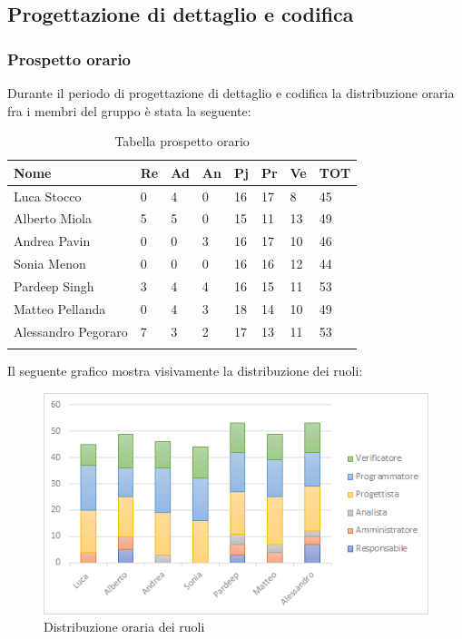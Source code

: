 \subsection{Progettazione di dettaglio e codifica}
\subsubsection{Prospetto orario}
Durante il periodo di progettazione di dettaglio e codifica la distribuzione oraria fra i membri del gruppo è stata la seguente:
\begin{center}
	\renewcommand{\arraystretch}{1.5}
	\begin{longtable}[H]{ p{3.5cm}  p{1.2cm} p{1.2cm}  p{1.2cm} p{1.2cm}  p{1.2cm} p{1.2cm}  p{1.4cm}  }
		\rowcolor{tableHeadYellow}
		\textbf{Nome}   & \textbf{Re} & \textbf{Ad} & \textbf{An} & \textbf{Pj} & \textbf{Pr} & \textbf{Ve} & \textbf{TOT} \\ 
		\endhead
		Luca Stocco       & 0   & 4     & 0   & 16   & 17   & 8   	& 45 \\  
		Alberto Miola     & 5   & 5     & 0   & 15   & 11   & 13  	& 49 \\  
		Andrea Pavin      & 0   & 0     & 3   & 16   & 17   & 10  	& 46 \\  
		Sonia Menon       & 0   & 0     & 0   & 16   & 16   & 12  	& 44 \\  
		Pardeep Singh     & 3   & 4     & 4   & 16   & 15   & 11  	& 53 \\  
		Matteo Pellanda   & 0   & 4     & 3   & 18   & 14   & 10  	& 49 \\
		Alessandro Pegoraro & 7 & 3		& 2	  & 17	 & 13	& 11 	& 53 \\   
		\rowcolor{white}
		\caption{Tabella prospetto orario}
	\end{longtable}
\end{center}
Il seguente grafico mostra visivamente la distribuzione dei ruoli:
\begin{figure}[H]
	\centering
	\includegraphics[width=15cm,keepaspectratio]{../includes/pics/grafici/grafico7.png}
	\caption{\label{fig:mission}Distribuzione oraria dei ruoli}
\end{figure}
\clearpage
